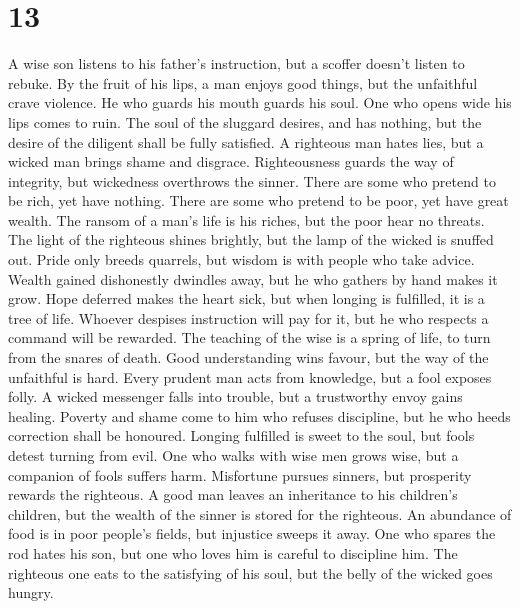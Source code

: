 \hypertarget{section-12}{%
\section{13}\label{section-12}}

 A wise son listens to his father's instruction, but a
scoffer doesn't listen to rebuke.  By the fruit of his lips,
a man enjoys good things, but the unfaithful crave violence.
 He who guards his mouth guards his soul. One who opens wide
his lips comes to ruin.  The soul of the sluggard desires,
and has nothing, but the desire of the diligent shall be fully
satisfied.  A righteous man hates lies, but a wicked man
brings shame and disgrace.  Righteousness guards the way of
integrity, but wickedness overthrows the sinner.  There are
some who pretend to be rich, yet have nothing. There are some who
pretend to be poor, yet have great wealth.  The ransom of a
man's life is his riches, but the poor hear no threats.  The
light of the righteous shines brightly, but the lamp of the wicked is
snuffed out.  Pride only breeds quarrels, but wisdom is
with people who take advice.  Wealth gained dishonestly
dwindles away, but he who gathers by hand makes it grow. 
Hope deferred makes the heart sick, but when longing is fulfilled, it is
a tree of life.  Whoever despises instruction will pay for
it, but he who respects a command will be rewarded.  The
teaching of the wise is a spring of life, to turn from the snares of
death.  Good understanding wins favour, but the way of the
unfaithful is hard.  Every prudent man acts from knowledge,
but a fool exposes folly.  A wicked messenger falls into
trouble, but a trustworthy envoy gains healing.  Poverty
and shame come to him who refuses discipline, but he who heeds
correction shall be honoured.  Longing fulfilled is sweet
to the soul, but fools detest turning from evil.  One who
walks with wise men grows wise, but a companion of fools suffers harm.
 Misfortune pursues sinners, but prosperity rewards the
righteous.  A good man leaves an inheritance to his
children's children, but the wealth of the sinner is stored for the
righteous.  An abundance of food is in poor people's
fields, but injustice sweeps it away.  One who spares the
rod hates his son, but one who loves him is careful to discipline him.
 The righteous one eats to the satisfying of his soul, but
the belly of the wicked goes hungry.

